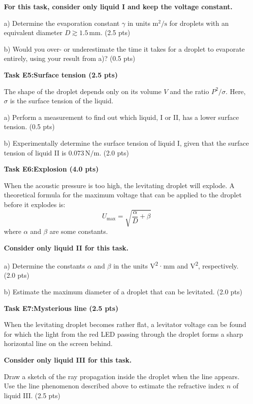 \textbf{For this task, consider only liquid I and keep the voltage constant.}

a) Determine the evaporation constant $\gamma$ in units $\mathrm{m^2/s}$ for
droplets with an equivalent diameter $D \gtrsim 1.5\,\mathrm{mm}$. (2.5 pts)

b) Would you over- or underestimate the time it takes for a droplet to
evaporate entirely, using your result from a)? (0.5 pts)

\textbf{Task E5:\quad Surface tension (2.5 pts)}

The shape of the droplet depends only on its volume $V$ and the ratio
$P^2/\sigma$. Here, $\sigma$ is the surface tension of the liquid.

a) Perform a measurement to find out which liquid, I or II, has a lower
surface tension. (0.5 pts)

b) Experimentally determine the surface tension of liquid I, given that the
surface tension of liquid II is $0.073\,\mathrm{N/m}$. (2.0 pts)

\textbf{Task E6:\quad Explosion (4.0 pts)}

When the acoustic pressure is too high, the levitating droplet will explode. A
theoretical formula for the maximum voltage that can be applied to the droplet
before it explodes is:
\begin{equation}
U_\mathrm{max} = \sqrt{\frac{\alpha}{D} + \beta} \tag{4}
\end{equation}
where $\alpha$ and $\beta$ are some constants.

\textbf{Consider only liquid II for this task.}

a) Determine the constants $\alpha$ and $\beta$ in the units
V\textsuperscript{2}·mm and V\textsuperscript{2}, respectively. (2.0 pts)

b) Estimate the maximum diameter of a droplet that can be levitated. (2.0 pts)

\textbf{Task E7:\quad Mysterious line (2.5 pts)}

When the levitating droplet becomes rather flat, a levitator voltage can be
found for which the light from the red LED passing through the droplet forms a
sharp horizontal line on the screen behind.

\textbf{Consider only liquid III for this task.}

Draw a sketch of the ray propagation inside the droplet when the line appears.
Use the line phenomenon described above to estimate the refractive index $n$
of liquid III. (2.5 pts)

